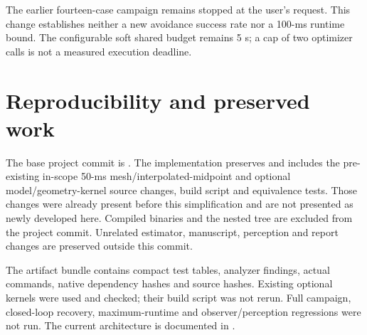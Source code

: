 \documentclass[11pt]{article}
\begin{document}
The earlier fourteen-case campaign remains stopped at the user's request.
This change establishes neither a new avoidance success rate nor a 100-ms
runtime bound. The configurable soft shared budget remains 5 s; a cap of two
optimizer calls is not a measured execution deadline.

\section{Reproducibility and preserved work}
The base project commit is
. The implementation preserves and
includes the pre-existing in-scope 50-ms mesh/interpolated-midpoint and optional
model/geometry-kernel source changes, build script and equivalence tests. Those
changes were already present before this simplification and are not presented
as newly developed here. Compiled binaries and the nested  tree
are excluded from the project commit. Unrelated estimator, manuscript,
perception and report changes are preserved outside this commit.

The artifact bundle contains compact test tables, analyzer findings, actual
commands, native dependency hashes and source hashes. Existing optional kernels
were used and checked; their build script was not rerun. Full campaign,
closed-loop recovery, maximum-runtime and observer/perception regressions were
not run. The current architecture is documented in
.
\end{document}
